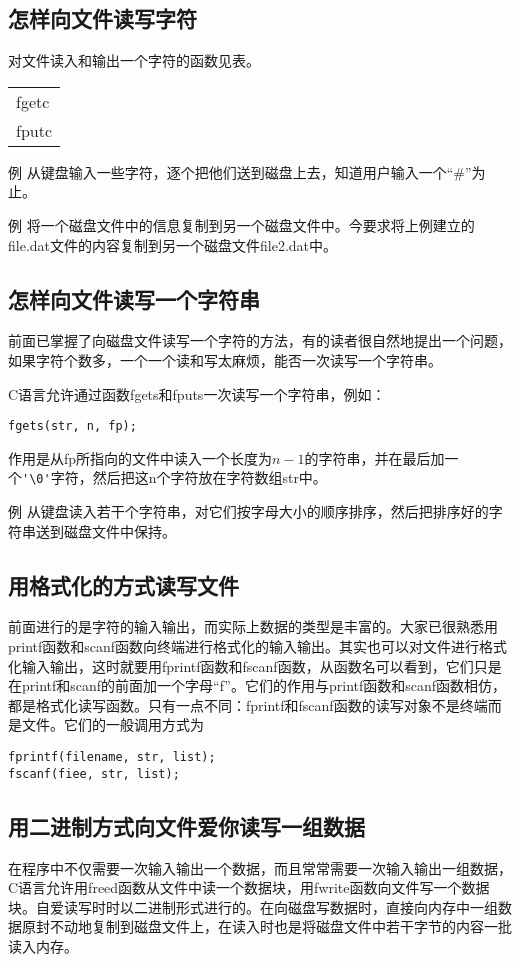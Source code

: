 \subsection{怎样向文件读写字符}
对文件读入和输出一个字符的函数见表。
\begin{table}
	\begin{tabular}{l}
		\hline
		fgetc \\
		fputc \\
		\hline
	\end{tabular}
\end{table}
例 从键盘输入一些字符，逐个把他们送到磁盘上去，知道用户输入一个“\#”为止。

例 将一个磁盘文件中的信息复制到另一个磁盘文件中。今要求将上例建立的file.dat文件的内容复制到另一个磁盘文件file2.dat中。
\subsection{怎样向文件读写一个字符串}
前面已掌握了向磁盘文件读写一个字符的方法，有的读者很自然地提出一个问题，如果字符个数多，一个一个读和写太麻烦，能否一次读写一个字符串。

C语言允许通过函数fgets和fputs一次读写一个字符串，例如：
\begin{lstlisting}
fgets(str, n, fp);
\end{lstlisting}
作用是从fp所指向的文件中读入一个长度为$n-1$的字符串，并在最后加一个\verb|'\0'|字符，然后把这n个字符放在字符数组str中。

例 从键盘读入若干个字符串，对它们按字母大小的顺序排序，然后把排序好的字符串送到磁盘文件中保持。
\subsection{用格式化的方式读写文件}
前面进行的是字符的输入输出，而实际上数据的类型是丰富的。大家已很熟悉用printf函数和scanf函数向终端进行格式化的输入输出。其实也可以对文件进行格式化输入输出，这时就要用fprintf函数和fscanf函数，从函数名可以看到，它们只是在printf和scanf的前面加一个字母“f”。它们的作用与printf函数和scanf函数相仿，都是格式化读写函数。只有一点不同：fprintf和fscanf函数的读写对象不是终端而是文件。它们的一般调用方式为
\begin{lstlisting}
fprintf(filename, str, list);
fscanf(fiee, str, list);
\end{lstlisting}
\subsection{用二进制方式向文件爱你读写一组数据}
在程序中不仅需要一次输入输出一个数据，而且常常需要一次输入输出一组数据，C语言允许用freed函数从文件中读一个数据块，用fwrite函数向文件写一个数据块。自爱读写时时以二进制形式进行的。在向磁盘写数据时，直接向内存中一组数据原封不动地复制到磁盘文件上，在读入时也是将磁盘文件中若干字节的内容一批读入内存。

